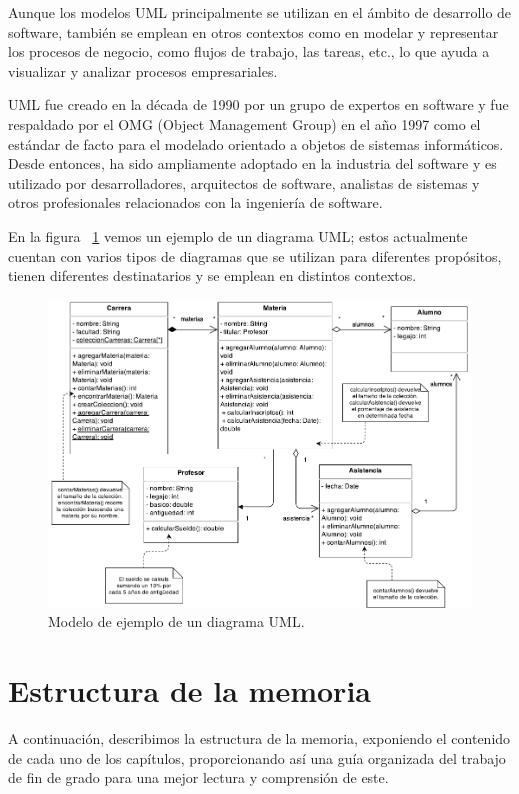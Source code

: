 \documentclass[a4paper, 12pt]{book}
\begin{document}
Aunque los modelos UML principalmente se utilizan en el ámbito de desarrollo de software, también se emplean en otros contextos como en modelar y representar los procesos de negocio, como flujos de trabajo, las tareas, etc., lo que ayuda a visualizar y analizar procesos empresariales.


UML fue creado en la década de 1990 por un grupo de expertos en software y fue respaldado por el OMG (Object Management Group) en el año 1997 como el estándar de facto para el modelado orientado a objetos de sistemas informáticos. 
Desde entonces, ha sido ampliamente adoptado en la industria del software y es utilizado por desarrolladores, arquitectos de software, analistas de sistemas y otros profesionales relacionados con la ingeniería de software. 


En la figura ~\ref{fig:diagrama-uml} vemos un ejemplo de un diagrama UML; estos actualmente cuentan con varios tipos de diagramas que se utilizan para diferentes propósitos, tienen diferentes destinatarios y se emplean en distintos contextos.


\begin{figure}
  \centering
  \includegraphics[width=16cm, keepaspectratio]{img/Diagrama-uml.png}
  \caption{Modelo de ejemplo de un diagrama UML.}\label{fig:diagrama-uml}
\end{figure}


\section{Estructura de la memoria}
\label{sec:estructura}

A continuación, describimos la estructura de la memoria, exponiendo el contenido de cada uno de los capítulos, proporcionando así una guía organizada del trabajo de fin de grado para una mejor lectura y comprensión de este.
\end{document}
